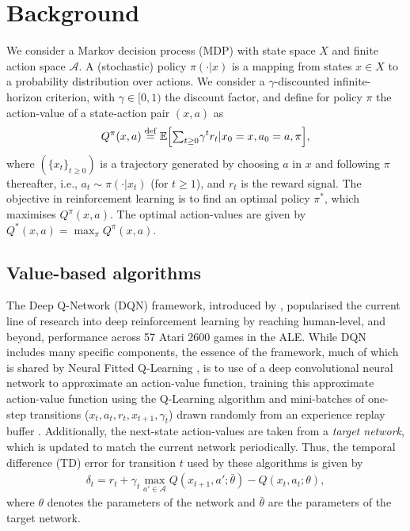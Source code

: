 \documentclass{article}
\newcommand{\beqa}{\begin{eqnarray}}
\newcommand{\eeqa}{\end{eqnarray}}
\newcommand{\E}{{\mathbb E}}
\newcommand{\eqdef}{\stackrel{\rm def}{=}}
\newcommand{\todo}[1]{{\bf[#1]}}
\begin{document}
\section{Background}
We consider a Markov decision process (MDP) with state space $X$ and finite 
action space $\mathcal{A}$. 
A (stochastic) policy $\pi(\cdot | x)$ is a mapping from states $x \in X$ to a 
probability distribution over 
actions. We consider a $\gamma$-discounted infinite-horizon criterion, with 
$\gamma \in [0, 1)$ the discount factor, and define for policy $\pi$ the action-value of 
a state-action pair $(x,a)$ as 
$$Q^{\pi}(x,a) \eqdef \E\Big[ {\textstyle \sum_{t\geq 0} } \gamma^t r_t | x_0=x, a_0=a, \pi\Big],$$
where $(\{x_t\}_{t\geq 0})$ is a trajectory generated by choosing $a$ in $x$ 
and following $\pi$ thereafter, i.e., $a_t\sim \pi(\cdot|x_t)$ (for $t\geq 1$), 
and $r_t$ is the reward signal. The objective in reinforcement learning 
is to find an optimal policy $\pi^*$, which maximises $Q^{\pi}(x,a)$. 
The optimal action-values are given by $Q^*(x,a)=\max_{\pi} Q^{\pi}(x,a)$. 


\subsection{Value-based algorithms}

The Deep Q-Network (DQN) framework, introduced by \citet{mnih15human}, 
popularised the current line of research into deep reinforcement learning by reaching 
human-level, and beyond, performance across 57 Atari 2600 games in the ALE. 
While DQN includes many specific components, the essence of the framework, much 
of which is shared by Neural Fitted Q-Learning \citep{riedmiller2005neural}, is 
to use of a deep convolutional neural network to approximate an action-value 
function, training this approximate action-value function using the 
Q-Learning algorithm \citep{watkins1992} and mini-batches of one-step 
transitions ($x_t, a_t, r_t, x_{t+1}, \gamma_t$) drawn randomly from an 
experience replay buffer \citep{lin1992self}. Additionally, the next-state 
action-values are taken from a \textit{target network}, which is updated to 
match the current network periodically. Thus, the temporal difference (TD) error 
for transition $t$ used by these algorithms is given by
\beqa\label{eq:tderr}
\delta_t = r_t + \gamma_t \max_{a' \in \mathcal{A}} Q(x_{t+1}, a'; \bar \theta) - Q(x_t, 
a_t; \theta),
\eeqa
where $\theta$ denotes the parameters of the network and $\bar \theta$ are the 
parameters of the target network.
\end{document}
